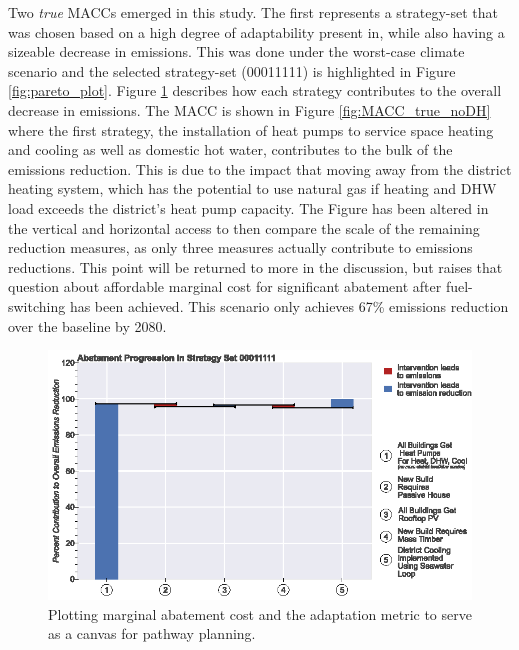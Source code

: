 \documentclass[twocolumn, a4paper,10pt]{article}
\begin{document}
Two \textit{true} MACCs emerged in this study. The first represents a strategy-set that was chosen based on a high degree of adaptability present in, while also having a sizeable decrease in emissions. This was done under the worst-case climate scenario and the selected strategy-set (00011111) is highlighted in Figure \ref{fig:pareto_plot}. Figure \ref{fig:MACC_true_noDH_waterfall} describes how each strategy contributes to the overall decrease in emissions. The MACC is shown in Figure \ref{fig:MACC_true_noDH} where the first strategy, the installation of heat pumps to service space heating and cooling as well as domestic hot water, contributes to the bulk of the emissions reduction. This is due to the impact that moving away from the district heating system, which has the potential to use natural gas if heating and DHW load exceeds the district's heat pump capacity. The Figure has been altered in the vertical and horizontal access to then compare the scale of the remaining reduction measures, as only three measures actually contribute to emissions reductions. This point will be returned to more in the discussion, but raises that question about affordable marginal cost for significant abatement after fuel-switching has been achieved. This scenario only achieves 67\% emissions reduction over the baseline by 2080.

\begin{figure}[hbpt]
    \centering
    \includegraphics[scale=1]{figures/true_macc_noDH_waterfall.eps}
    \caption{Plotting marginal abatement cost and the adaptation metric to serve as a canvas for pathway planning.}
    \label{fig:MACC_true_noDH_waterfall}
\end{figure}
\end{document}

